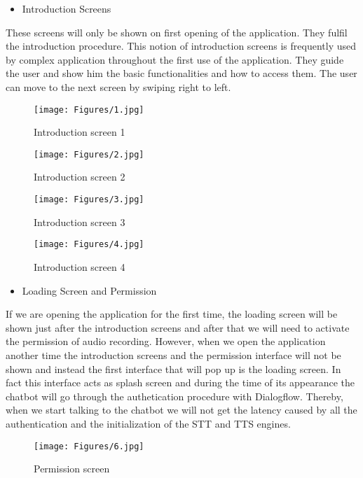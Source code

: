 \begin{itemize}
    \item Introduction Screens
\end{itemize}
These screens will only be shown on first opening of the application. They fulfil the introduction procedure. This notion of introduction screens is frequently used by complex application throughout the first use of the application. They guide the user and show him the basic functionalities and how to access them. The user can move to the next screen by swiping right to left. 
\newline
\begin{figure}[H]
\centering
\begin{minipage}{.5\textwidth}
  \centering
  \texttt{[image: Figures/1.jpg]}
  \caption{Introduction screen 1}
\end{minipage}%
\begin{minipage}{.5\textwidth}
  \centering
  \texttt{[image: Figures/2.jpg]}
  \caption{Introduction screen 2}
\end{minipage}
\end{figure}
\begin{figure}[H]
\centering
\begin{minipage}{.5\textwidth}
  \centering
  \texttt{[image: Figures/3.jpg]}
  \caption{Introduction screen 3}
\end{minipage}%
\begin{minipage}{.5\textwidth}
  \centering
  \texttt{[image: Figures/4.jpg]}
  \caption{Introduction screen 4}
\end{minipage}
\end{figure}
\newpage
\begin{itemize}
    \item Loading Screen and Permission
\end{itemize}
If we are opening the application for the first time, the loading screen will be shown just after the introduction screens and after that we will need to activate the permission of audio recording. However, when we open the application another time the introduction screens and the permission interface will not be shown and instead the first interface that will pop up is the loading screen. In fact this interface acts as splash screen and during the time of its appearance the chatbot will go through the authetication procedure with Dialogflow. Thereby, when we start talking to the chatbot we will not get the latency caused by all the authentication and the initialization of the STT and TTS engines.
\begin{figure}[H]
\centering
\texttt{[image: Figures/6.jpg]}
\caption{Permission screen}
\end{figure}

